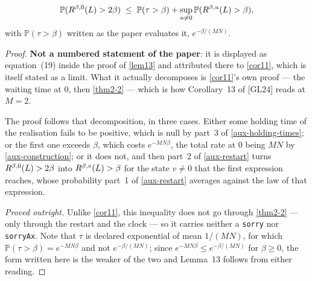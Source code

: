 \begin{lemma}
  \label{eq19}
  \leanok
  \[
    \mathbb{P}(R^{\beta,0}(L) > 2\beta)
      \;\le\; \mathbb{P}(\tau > \beta)
        + \sup_{u \ne 0} \mathbb{P}(R^{\beta,u}(L) > \beta),
  \]
  with $\mathbb{P}(\tau > \beta)$ written as the paper evaluates it,
  $e^{-\beta/(MN)}$.
\end{lemma}
\begin{proof}
  \leanok
  \textbf{Not a numbered statement of the paper}: it is displayed as
  equation~(19) inside the proof of \ref{lem13} and attributed there to
  \ref{cor11}, which is itself stated as a limit.  What it actually decomposes
  is \ref{cor11}'s own proof --- the waiting time at $0$, then \ref{thm2-2} ---
  which is how Corollary~13 of [GL24] reads at $M = 2$.

  The proof follows that decomposition, in three cases.  Either some holding
  time of the realisation fails to be positive, which is null by part~3 of
  \ref{aux-holding-times}; or the first one exceeds $\beta$, which costs
  $e^{-MN\beta}$, the total rate at $0$ being $MN$ by \ref{aux-construction};
  or it does not, and then part~2 of \ref{aux-restart} turns
  $R^{\beta,0}(L) > 2\beta$ into $R^{\beta,v}(L) > \beta$ for the state
  $v \ne 0$ that the first expression reaches, whose probability part~1 of
  \ref{aux-restart} averages against the law of that expression.

  \emph{Proved outright.}  Unlike \ref{cor11}, this inequality does not go
  through \ref{thm2-2} --- only through the restart and the clock --- so it
  carries neither a \texttt{sorry} nor \texttt{sorryAx}.  Note that $\tau$ is
  declared exponential of mean $1/(MN)$, for which $\mathbb{P}(\tau > \beta) =
  e^{-MN\beta}$ and not $e^{-\beta/(MN)}$; since $e^{-MN\beta} \le
  e^{-\beta/(MN)}$ for $\beta \ge 0$, the form written here is the weaker of
  the two and Lemma~13 follows from either reading.
\end{proof}

